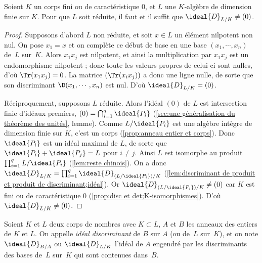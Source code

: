 \documentclass[11pt, %
  title in boldface,
  theorem in new line,
  theorem numbering = section,
  number theorems separately,
  simple name,
]{beaulivre}
\begin{document}
    \begin{lemma}\label{lem:condition d'être réduite par le discriminant}
        Soient \( K \) un corps fini ou de caractéristique \( 0 \), et \( L \) une \( K \)‑algèbre de dimension finie sur \( K \). Pour que \( L \) soit réduite, il faut et il suffit que \( \ideal{D}_{L/K} \neq (0) \).
    \end{lemma}
    \begin{proof}
        Supposons d'abord \( L \) non réduite, et soit \( x \in L \) un élément nilpotent non nul. On pose \( x_1 = x \) et on complète ce début de base en une base \( (x_1, \cdots, x_n) \) de~\( L \) sur~\( K \). Alors \( x_1 x_j \) est nilpotent, et ainsi la multiplication par \( x_1 x_j \) est un endomorphisme nilpotent ; donc toute les valeurs propres de celui-ci sont nulles, d'où \( \Tr(x_1 x_j) = 0 \). La matrice \( (\Tr(x_i x_j)) \) a donc une ligne nulle, de sorte que son discriminant \( \D(x_1, \cdots, x_n) \) est nul. D'où \( \ideal{D}_{L/K} = (0) \).

        Réciproquement, supposons \( L \) réduite. Alors l'idéal \( (0) \) de \( L \) est intersection finie d'idéaux premiers, \( (0) = \bigcap_{i=1}^q \ideal{P_i} \) (\cref{sec:une généralisation du théorème des unités}, lemme). Comme \( L/\ideal{P_i} \) est une algèbre intègre de dimension finie sur \( K \), c'est un corps (\cref{prop:anneau entier et corps}). Donc \( \ideal{P_i} \) est un idéal maximal de \( L \), de sorte que \( \ideal{P_i} + \ideal{P_j} = L \) pour \( i \neq j \). Ainsi \( L \) est isomorphe au produit \( \prod_{i=1}^q L/\ideal{P_i} \) (\cref{lem:reste chinois}). On a donc \( \ideal{D}_{L/K} = \prod_{i=1}^q \ideal{D}_{(L/\ideal{P_i})/K} \) (\cref{lem:discriminant de produit et produit de discriminant;idéal}). Or \( \ideal{D}_{(L/\ideal{P_i})/K} \neq (0) \) car \( K \) est fini ou de caractéristique \( 0 \) (\cref{prop:disc et det;K-isomorphismes}). D'où \( \ideal{D}_{L/K} \neq (0) \).
    \end{proof}

    \begin{definition}\label{def:idéal discriminant}
        Soient \( K \) et \( L \) deux corps de nombres avec \( K \subset L \), \( A \) et \( B \) les anneaux des entiers de \( K \) et \( L \). On appelle \emph{idéal discriminant} de \( B \) sur \( A \) (ou de~\( L \) sur~\( K \)), et on note \( \ideal{D}_{B/A} \) ou \( \ideal{D}_{L/K} \) l'idéal de \( A \) engendré par les discriminants des bases de~\( L \) sur~\( K \) qui sont contenues dans~\( B \).
    \end{definition}
\end{document}
